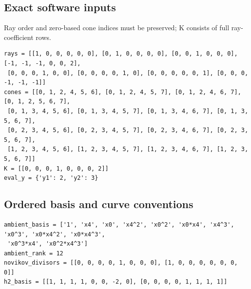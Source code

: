 \documentclass[10pt,a4paper]{article}
\begin{document}
\subsection*{Exact software inputs}
Ray order and zero-based cone indices must be preserved; K consists of full ray-coefficient rows.
\begin{lstlisting}
rays = [[1, 0, 0, 0, 0, 0], [0, 1, 0, 0, 0, 0], [0, 0, 1, 0, 0, 0], [-1, -1, -1, 0, 0, 2],
 [0, 0, 0, 1, 0, 0], [0, 0, 0, 0, 1, 0], [0, 0, 0, 0, 0, 1], [0, 0, 0, -1, -1, -1]]
cones = [[0, 1, 2, 4, 5, 6], [0, 1, 2, 4, 5, 7], [0, 1, 2, 4, 6, 7], [0, 1, 2, 5, 6, 7],
 [0, 1, 3, 4, 5, 6], [0, 1, 3, 4, 5, 7], [0, 1, 3, 4, 6, 7], [0, 1, 3, 5, 6, 7],
 [0, 2, 3, 4, 5, 6], [0, 2, 3, 4, 5, 7], [0, 2, 3, 4, 6, 7], [0, 2, 3, 5, 6, 7],
 [1, 2, 3, 4, 5, 6], [1, 2, 3, 4, 5, 7], [1, 2, 3, 4, 6, 7], [1, 2, 3, 5, 6, 7]]
K = [[0, 0, 0, 1, 0, 0, 0, 2]]
eval_y = {'y1': 2, 'y2': 3}
\end{lstlisting}
\subsection*{Ordered basis and curve conventions}
\begin{lstlisting}
ambient_basis = ['1', 'x4', 'x0', 'x4^2', 'x0^2', 'x0*x4', 'x4^3', 'x0^3', 'x0*x4^2', 'x0*x4^3',
 'x0^3*x4', 'x0^2*x4^3']
ambient_rank = 12
novikov_divisors = [[0, 0, 0, 0, 1, 0, 0, 0], [1, 0, 0, 0, 0, 0, 0, 0]]
h2_basis = [[1, 1, 1, 1, 0, 0, -2, 0], [0, 0, 0, 0, 1, 1, 1, 1]]
\end{lstlisting}
\end{document}
